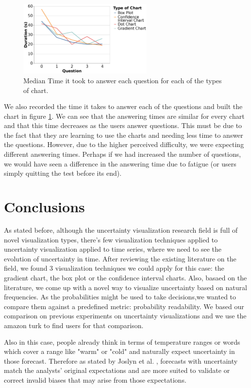 \documentclass[a4paper,3p,sort&compress]{elsarticle}
\begin{document}
\begin{figure}
  \centering
   \includegraphics[width=0.6\textwidth]{duration_evo2}
  \caption{\label{figure:duration} Median Time it took to answer each question for each of the types of chart.}
\end{figure}  

We also recorded the time it takes to answer each of the questions and built the chart in figure \ref{figure:duration}. We 
can see that the answering times are similar for every chart and that this time decreases as the users answer questions.
This must be due to the fact that they are learning to use the charts and needing less time to answer the questions.
However, due to the higher perceived difficulty, we were expecting different answering times. Perhaps if we had 
increased the number of questions, we would have seen a difference in the answering time due to fatigue (or users simply quitting the test 
before its end).


\section{Conclusions}
\label{sec:concl}

As stated before, although the uncertainty visualization research field is full of novel visualization types, there's few 
visualization techniques applied to uncertainty visualization applied to time series, where we need to see the evolution of uncertainty 
in time. After reviewing the existing literature on the field, we found 3 visualization techniques we could apply for this case:
the gradient chart, the box plot or the confidence interval charts. Also, basaed on the literature, we come up with a 
novel way to visualize uncertainty based on natural frequencies.
As the probabilities might be used to take decisions,we wanted to compare them against a predefined metric: probability readability.
We based our comparison on previous experiments on uncertainty visualizations and we use the amazon turk to find 
users for that comparison.

Also in this case, people already think in terms of temperature ranges or words which cover a range like "warm" or "cold" and naturally
expect uncertainty in those forecast. Therefore as stated by Joslyn et al.
\cite{joslyn_communicating_2010} , 
forecasts with uncertainty match the analysts' original expectations and are more suited to 
validate or correct invalid biases that may arise from those expectations.
\end{document}
